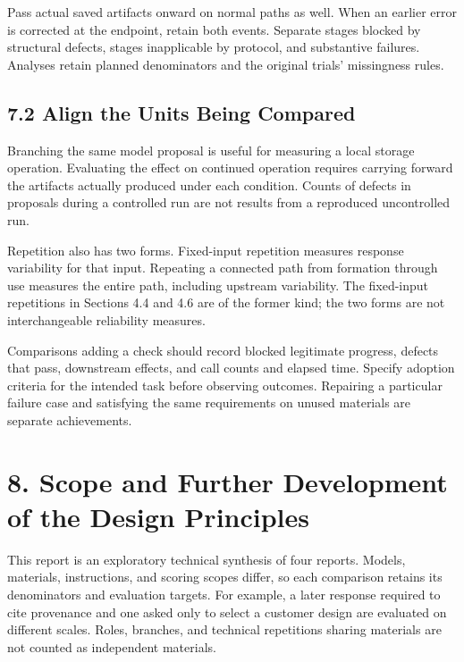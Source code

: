 \documentclass[10pt,a4paper]{article}
\begin{document}
Pass actual saved artifacts onward on normal paths as well. When an earlier error is corrected at the endpoint, retain both events. Separate stages blocked by structural defects, stages inapplicable by protocol, and substantive failures. Analyses retain planned denominators and the original trials' missingness rules.

\subsection{7.2 Align the Units Being Compared}\label{two-role-failure-design-align-the-units-being-compared}

Branching the same model proposal is useful for measuring a local storage operation. Evaluating the effect on continued operation requires carrying forward the artifacts actually produced under each condition. Counts of defects in proposals during a controlled run are not results from a reproduced uncontrolled run.

Repetition also has two forms. Fixed-input repetition measures response variability for that input. Repeating a connected path from formation through use measures the entire path, including upstream variability. The fixed-input repetitions in Sections 4.4 and 4.6 are of the former kind; the two forms are not interchangeable reliability measures.

Comparisons adding a check should record blocked legitimate progress, defects that pass, downstream effects, and call counts and elapsed time. Specify adoption criteria for the intended task before observing outcomes. Repairing a particular failure case and satisfying the same requirements on unused materials are separate achievements.

\section{8. Scope and Further Development of the Design Principles}\label{two-role-failure-design-scope-and-further-development-of-the-design-principles}

This report is an exploratory technical synthesis of four reports. Models, materials, instructions, and scoring scopes differ, so each comparison retains its denominators and evaluation targets. For example, a later response required to cite provenance and one asked only to select a customer design are evaluated on different scales. Roles, branches, and technical repetitions sharing materials are not counted as independent materials.
\end{document}

